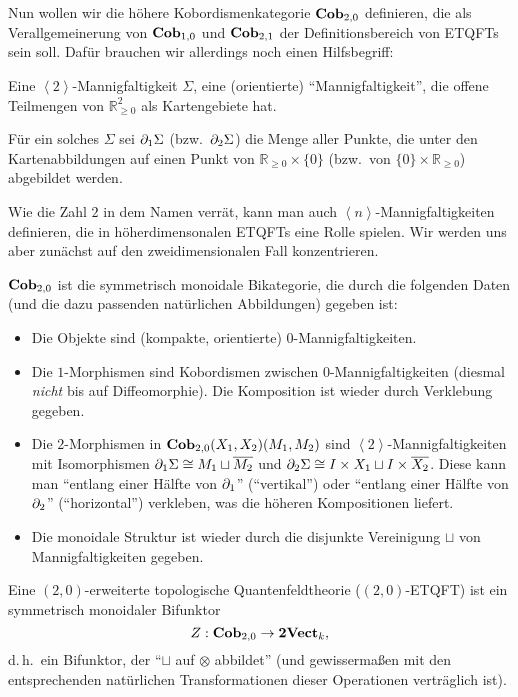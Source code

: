 
Nun wollen wir die h\"ohere Kobordismenkategorie $\mathbf{Cob}_{2, 0}$
definieren, die als Verallgemeinerung von $\mathbf{Cob}_{1, 0}$ und
$\mathbf{Cob}_{2, 1}$ der Definitionsbereich von ETQFTs sein soll. Daf\"ur
brauchen wir allerdings noch einen Hilfsbegriff:

\begin{Def}
Eine $\left<2\right>$-Mannigfaltigkeit $\Sigma$, eine (orientierte)
"`Mannigfaltigkeit"', die offene Teilmengen von $\mathbb{R}_{\geq 0}^2$ als
Kartengebiete hat.

F\"ur ein solches $\Sigma$ sei $\partial_1 \Sigma$ (bzw.\ $\partial_2 \Sigma$) die
Menge aller Punkte, die unter den Kartenabbildungen auf einen Punkt von
$\mathbb{R}_{\geq 0} \times \{0\}$ (bzw.\ von $\{0\} \times
\mathbb{R}_{\geq 0}$) abgebildet werden.
\end{Def}

Wie die Zahl $2$ in dem Namen verr\"at, kann man auch
$\left<n\right>$-Mannigfaltigkeiten definieren, die in h\"oherdimensonalen
ETQFTs eine Rolle spielen. Wir werden uns aber zun\"achst auf den
zweidimensionalen Fall konzentrieren.

\begin{Def}
$\mathbf{Cob}_{2, 0}$ ist die symmetrisch monoidale Bikategorie, die durch
die folgenden Daten (und die dazu passenden nat\"urlichen Abbildungen) gegeben
ist:
\begin{itemize}
\item Die Objekte sind (kompakte, orientierte) $0$-Mannigfaltigkeiten.
\item Die $1$-Morphismen sind Kobordismen zwischen $0$-Mannigfaltigkeiten
(diesmal \emph{nicht} bis auf Diffeomorphie). Die Komposition ist wieder durch
Verklebung gegeben.
\item Die $2$-Morphismen in $\mathbf{Cob}_{2, 0} (X_1, X_2) (M_1, M_2)$ sind
$\left<2\right>$-Mannigfaltigkeiten mit Isomorphismen $\partial_1 \Sigma \cong M_1
\sqcup \overline{M_2}$ und $\partial_2 \Sigma \cong I \times X_1 \sqcup I \times
\overline{X_2}$. Diese kann man "`entlang einer H\"alfte von $\partial_1$"'
("`vertikal"') oder "`entlang einer H\"alfte von $\partial_2$"' ("`horizontal"')
verkleben, was die h\"oheren Kompositionen liefert.
\item Die monoidale Struktur ist wieder durch die disjunkte Vereinigung
$\sqcup$ von Mannigfaltigkeiten gegeben.
\end{itemize}
\end{Def}

\begin{Def}
Eine $(2, 0)$-erweiterte topologische Quantenfeldtheorie ($(2, 0)$-ETQFT) ist
ein symmetrisch monoidaler Bifunktor
\begin{equation}
Z: \mathbf{Cob}_{2, 0} \to \mathbf{2Vect}_k, \nonumber
\end{equation}
d.\,h.\ ein Bifunktor, der "`$\sqcup$ auf $\otimes$ abbildet"' (und
gewisserma\ss en mit den entsprechenden nat\"urlichen Transformationen dieser
Operationen vertr\"aglich ist).
\end{Def}

